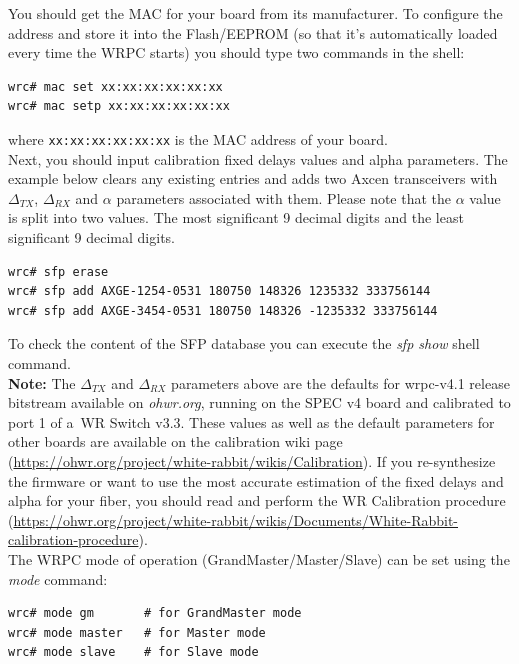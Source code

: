 \documentclass[a4paper, 12pt]{article}
\renewcommand{\_}{\underscore\allowbreak}
\begin{document}
You should get the MAC for your board from its manufacturer. To configure the
address and store it into the Flash/EEPROM (so that it's automatically loaded
every time the WRPC starts) you should type two commands in the shell:
\begin{lstlisting}
wrc# mac set xx:xx:xx:xx:xx:xx
wrc# mac setp xx:xx:xx:xx:xx:xx
\end{lstlisting}
where \texttt{xx:xx:xx:xx:xx:xx} is the MAC address of your board.\\

Next, you should input calibration fixed delays values and alpha parameters. The
example below clears any existing entries and adds two Axcen transceivers with
$\Delta_{TX}$, $\Delta_{RX}$ and $\alpha$ parameters associated with them.
Please note that the $\alpha$ value is split into two values. The most
significant 9 decimal digits and the least significant 9 decimal digits.

\begin{lstlisting}
wrc# sfp erase
wrc# sfp add AXGE-1254-0531 180750 148326 1235332 333756144
wrc# sfp add AXGE-3454-0531 180750 148326 -1235332 333756144
\end{lstlisting}

To check the content of the SFP database you can execute the \textit{sfp show}
shell command.\\

\noindent\textbf{Note:} The $\Delta_{TX}$ and $\Delta_{RX}$ parameters above are
the defaults for wrpc-v4.1 release bitstream available on \textit{ohwr.org},
running on the SPEC v4 board and calibrated to port 1 of a~WR Switch
v3.3. These values as well as the default parameters for other boards are
available on the calibration wiki page
(\url{https://ohwr.org/project/white-rabbit/wikis/Calibration}). If you
re-synthesize the firmware or want to use the most accurate estimation of
the fixed delays and alpha for your fiber, you should read and perform the WR
Calibration procedure
(\url{https://ohwr.org/project/white-rabbit/wikis/Documents/White-Rabbit-calibration-procedure}).\\

The WRPC  mode of operation (GrandMaster/Master/Slave) can be set
using the \textit{mode} command:

\begin{lstlisting}
wrc# mode gm       # for GrandMaster mode
wrc# mode master   # for Master mode
wrc# mode slave    # for Slave mode
\end{lstlisting}
\end{document}
